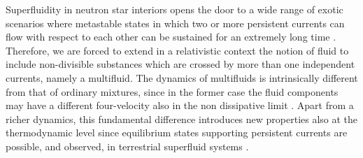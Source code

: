 \documentclass[usenatbib]{mnras}
\begin{document}
%
%
%
%
%
Superfluidity in neutron star interiors opens the door to a wide range of exotic scenarios where  metastable states in which two or more persistent currents can flow with respect to each other can be sustained for an extremely long time \citep{sauls1989superfluidity,haskellsedrakian2017,chamel_super}. 
Therefore, we are forced to extend in a relativistic context the notion of fluid to include non-divisible substances which are crossed by more than one independent currents, namely a multifluid. The dynamics of  multifluids is intrinsically different from that of ordinary mixtures, since in the former case the fluid components may have a different four-velocity also in the non dissipative limit \citep{andersson2007review}. 
Apart from a  richer dynamics, this fundamental difference introduces new properties also at the thermodynamic level since equilibrium states supporting persistent currents are possible, and observed, in terrestrial superfluid systems \citep{reppy_64}.
\end{document}
